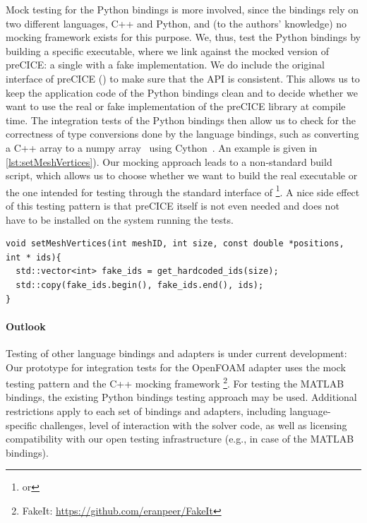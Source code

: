 Mock testing for the Python bindings is more involved, since the bindings rely on two different languages, C++ and Python, and (to the authors' knowledge) no mocking framework exists for this purpose. We, thus, test the Python bindings by building a specific executable, where we link against the mocked version of preCICE: a single  with a fake implementation. We do include the original interface of preCICE () to make sure that the API is consistent. This allows us to keep the application code of the Python bindings clean and to decide whether we want to use the real or fake implementation of the preCICE library at compile time.
The integration tests of the Python bindings then allow us to check for the correctness of type conversions done by the language bindings, such as converting a C++  array to a numpy array~\cite{NumPy} using Cython~\cite{behnel2011cython}. An example is given in \autoref{lst:setMeshVertices}).
Our mocking approach leads to a non-standard  build script, which allows us to choose whether we want to build the real executable or the one intended for testing through the standard interface of \footnote{ or }. A nice side effect of this testing pattern is that preCICE itself is not even needed and does not have to be installed on the system running the tests.

\begin{listing}[h!]
\begin{verbatim}
void setMeshVertices(int meshID, int size, const double *positions, int * ids){
  std::vector<int> fake_ids = get_hardcoded_ids(size);
  std::copy(fake_ids.begin(), fake_ids.end(), ids);
}
\end{verbatim}
\caption{Fake implementation of  used for integration tests of Python bindings. The fake version of  just returns fake vertex IDs. If an integration test of the Python bindings is calling this function, one can easily check whether the obtained vertex IDs are the expected ones using Python's unit testing framework.}
\label{lst:setMeshVertices}
\end{listing}


\paragraph{Outlook} Testing of other language bindings and adapters is under current development: Our prototype for integration tests for the OpenFOAM adapter uses the mock testing pattern and the C++ mocking framework \footnote{FakeIt: \url{https://github.com/eranpeer/FakeIt}}. For testing the MATLAB bindings, the existing Python bindings testing approach may be used. Additional restrictions apply to each set of bindings and adapters, including language-specific challenges, level of interaction with the solver code, as well as licensing compatibility with our open testing infrastructure (e.g., in case of the MATLAB bindings).

